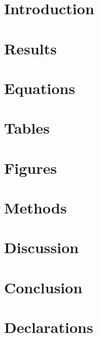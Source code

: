 \documentclass[pdflatex,sn-mathphys-num]{sn-jnl}%
\theoremstyle{thmstyleone}%
\theoremstyle{thmstyletwo}%
\theoremstyle{thmstylethree}%
\begin{document}
\section{Introduction}\label{sec1}
 

\section{Results}\label{sec2}


\section{Equations}\label{sec4}

\section{Tables}\label{sec5}

\section{Figures}\label{sec6}
 

\section{Methods}\label{sec11}

\section{Discussion}\label{sec12}


\section{Conclusion}\label{sec13}


\backmatter





\section*{Declarations}



\end{document}

